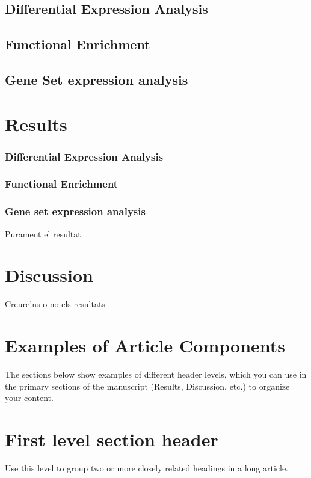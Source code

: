 \documentclass[9pt,twocolumn,twoside]{gsajnl}
\begin{document}
\subsection*{Differential Expression Analysis}
\subsection*{Functional Enrichment}
\subsection*{Gene Set expression analysis}


\section*{Results}
\subsubsection*{Differential Expression Analysis}
\subsubsection*{Functional Enrichment}
\subsubsection*{Gene set expression analysis}

Purament el resultat


\section*{Discussion}

Creure'ns o no els resultats


\section*{Examples of Article Components}
\label{sec:examples}

The sections below show examples of different header levels, which you can use in the primary sections of the manuscript (Results, Discussion, etc.) to organize your content.

\section*{First level section header}

Use this level to group two or more closely related headings in a long article.
\end{document}
